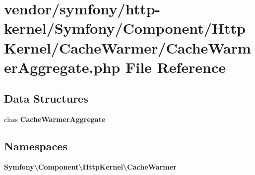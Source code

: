 \section{vendor/symfony/http-\/kernel/\+Symfony/\+Component/\+Http\+Kernel/\+Cache\+Warmer/\+Cache\+Warmer\+Aggregate.php File Reference}
\label{_cache_warmer_aggregate_8php}
\subsection*{Data Structures}
\begin{DoxyCompactItemize}
\item 
class {\bf Cache\+Warmer\+Aggregate}
\end{DoxyCompactItemize}
\subsection*{Namespaces}
\begin{DoxyCompactItemize}
\item 
 {\bf Symfony\textbackslash{}\+Component\textbackslash{}\+Http\+Kernel\textbackslash{}\+Cache\+Warmer}
\end{DoxyCompactItemize}
